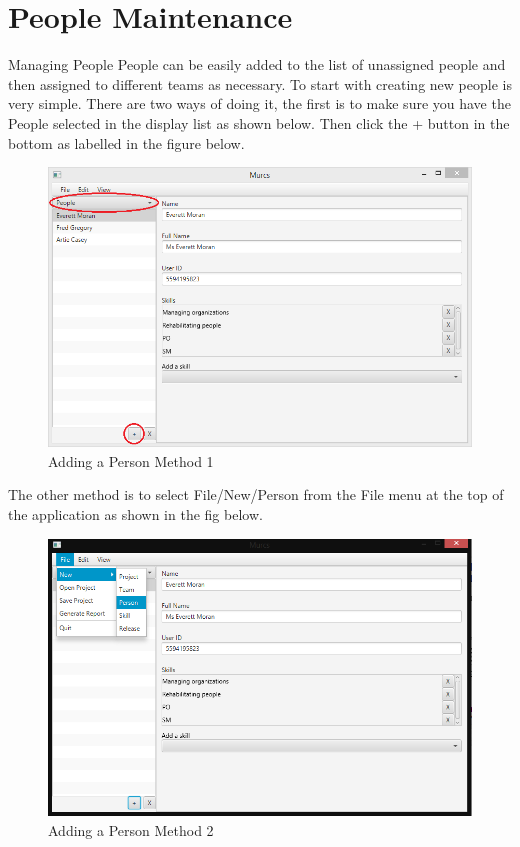 \section{People Maintenance}

Managing People
\newline\newline
People can be easily added to the list of unassigned people and then assigned to different teams as necessary.
\newline
To start with creating new people is very simple. There are two ways of doing it, the first is to make sure you have the People selected in the display list as shown below. Then click the + button in the bottom as labelled in the figure below.

\begin{figure}[H]
\centering
\includegraphics[width=\textwidth]{images/screenshots/people1.PNG}
\caption{Adding a Person Method 1}
\label{fig:new_project}
\end{figure}

The other method is to select File/New/Person from the File menu at the top of the application as shown in the fig below.

\begin{figure}[H]
\centering
\includegraphics[width=\textwidth]{images/screenshots/people4.PNG}
\caption{Adding a Person Method 2}
\label{fig:new_project}
\end{figure}

